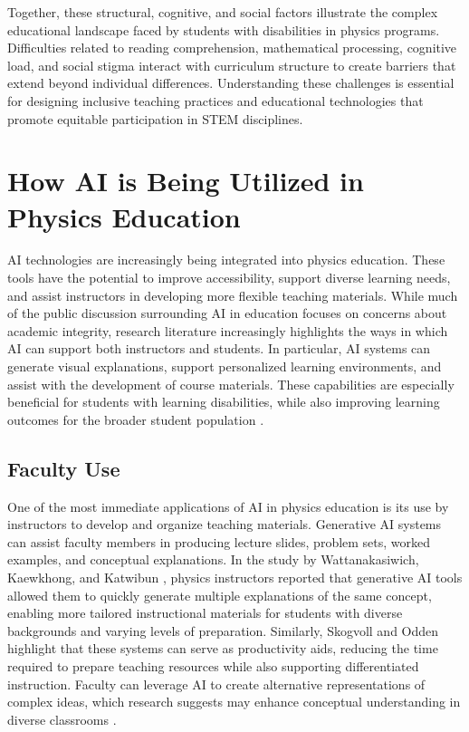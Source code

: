 \documentclass[]{aastex701}
\begin{document}
Together, these structural, cognitive, and social factors illustrate the complex educational landscape faced by students with disabilities in physics programs. Difficulties related to reading comprehension, mathematical processing, cognitive load, and social stigma interact with curriculum structure to create barriers that extend beyond individual differences. Understanding these challenges is essential for designing inclusive teaching practices and educational technologies that promote equitable participation in STEM disciplines.


\section{How AI is Being Utilized in Physics Education}

AI technologies are increasingly being integrated into physics education. These tools have the potential to improve accessibility, support diverse learning needs, and assist instructors in developing more flexible teaching materials. While much of the public discussion surrounding AI in education focuses on concerns about academic integrity, research literature increasingly highlights the ways in which AI can support both instructors and students. In particular, AI systems can generate visual explanations, support personalized learning environments, and assist with the development of course materials. These capabilities are especially beneficial for students with learning disabilities,  while  also improving learning outcomes for the broader student population \citep{Voultsiou2025, HarkinsBrown2025, USDOE2023}.


\subsection{Faculty Use}

One of the most immediate applications of AI in physics education is its use by instructors to develop and organize teaching materials. Generative AI systems can assist faculty members in producing lecture slides, problem sets, worked examples, and conceptual explanations. In the study by Wattanakasiwich, Kaewkhong, and Katwibun \citep{Wattanakasiwich2025}, physics instructors reported that generative AI tools allowed them to quickly generate multiple explanations of the same concept, enabling more tailored instructional materials for students with diverse backgrounds and varying levels of preparation. Similarly, Skogvoll and Odden \citep{Skogvoll2025} highlight that these systems can serve as productivity aids, reducing the time required to prepare teaching resources while also supporting differentiated instruction. Faculty can leverage AI to create alternative representations of complex ideas, which research suggests may enhance conceptual understanding in diverse classrooms \citep{Wattanakasiwich2025, Skogvoll2025}.
\end{document}
